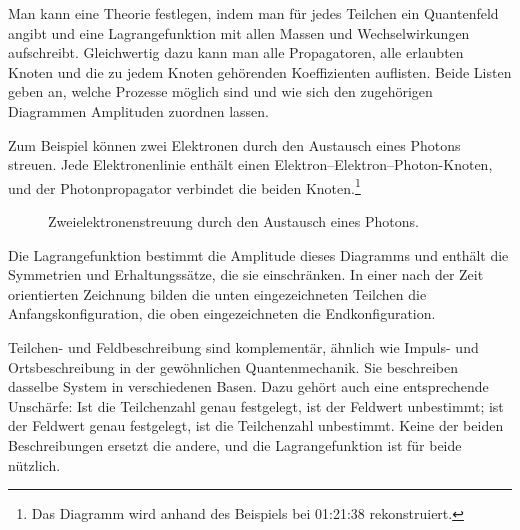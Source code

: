 Man kann eine Theorie festlegen, indem man für jedes Teilchen ein Quantenfeld angibt und eine Lagrangefunktion mit allen Massen und Wechselwirkungen aufschreibt. Gleichwertig dazu kann man alle Propagatoren, alle erlaubten Knoten und die zu jedem Knoten gehörenden Koeffizienten auflisten. Beide Listen geben an, welche Prozesse möglich sind und wie sich den zugehörigen Diagrammen Amplituden zuordnen lassen.

Zum Beispiel können zwei Elektronen durch den Austausch eines Photons streuen. Jede Elektronenlinie enthält einen Elektron--Elektron--Photon-Knoten, und der Photonpropagator verbindet die beiden Knoten.\footnote{Das Diagramm wird anhand des Beispiels bei 01:21:38 rekonstruiert.}

\begin{figure}[htbp]
\centering
{}
\caption{Zweielektronenstreuung durch den Austausch eines Photons.}
\end{figure}

Die Lagrangefunktion bestimmt die Amplitude dieses Diagramms und enthält die Symmetrien und Erhaltungssätze, die sie einschränken. In einer nach der Zeit orientierten Zeichnung bilden die unten eingezeichneten Teilchen die Anfangskonfiguration, die oben eingezeichneten die Endkonfiguration.

\begin{classroomqa}
\end{classroomqa}

Teilchen- und Feldbeschreibung sind komplementär, ähnlich wie Impuls- und Ortsbeschreibung in der gewöhnlichen Quantenmechanik. Sie beschreiben dasselbe System in verschiedenen Basen. Dazu gehört auch eine entsprechende Unschärfe: Ist die Teilchenzahl genau festgelegt, ist der Feldwert unbestimmt; ist der Feldwert genau festgelegt, ist die Teilchenzahl unbestimmt. Keine der beiden Beschreibungen ersetzt die andere, und die Lagrangefunktion ist für beide nützlich.

